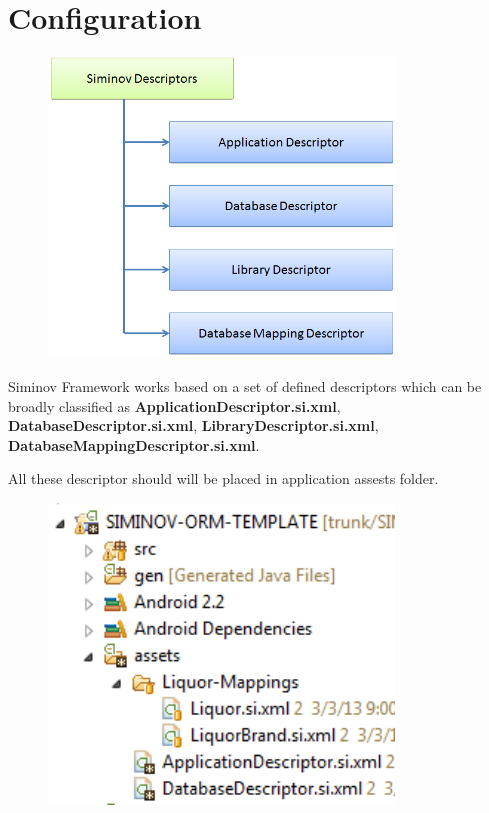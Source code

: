 \newpage
\chapter {\Large{Configuration}}

\begin{figure}[htbp]
	\centering
		\includegraphics[height=8cm]{Resources/siminov_descriptors.png}
\end{figure}

\par
Siminov Framework works based on a set of defined descriptors which can be broadly classified as \textbf{ApplicationDescriptor.si.xml}, \textbf{DatabaseDescriptor.si.xml}, \textbf{LibraryDescriptor.si.xml}, \textbf{DatabaseMappingDescriptor.si.xml}.

\par
All these descriptor should will be placed in application assests folder. 

\newpage
\begin{figure}[!htbp]
	\centering
		\includegraphics[height=8cm]{Resources/application_assests_structure.png}
\end{figure}


